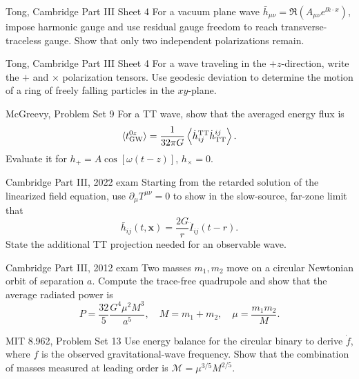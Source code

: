 \begin{exercises}

\begin{exercise}{Tong, Cambridge Part III Sheet 4}
For a vacuum plane wave
\(\bar h_{\mu\nu}=\Re(A_{\mu\nu}e^{\ii k\cdot x})\), impose harmonic gauge and
use residual gauge freedom to reach transverse-traceless gauge.  Show that
only two independent polarizations remain.
\end{exercise}

\begin{exercise}{Tong, Cambridge Part III Sheet 4}
For a wave traveling in the \(+z\)-direction, write the \(+\) and \(\times\)
polarization tensors.  Use geodesic deviation to determine the motion of a
ring of freely falling particles in the \(xy\)-plane.
\end{exercise}

\begin{exercise}{McGreevy, Problem Set 9}
For a TT wave, show that the averaged energy flux is
\[
\langle t^{0z}_{\rm GW}\rangle
=\frac1{32\pi G}
\left\langle\dot h^{\rm TT}_{ij}\dot h_{\rm TT}^{ij}\right\rangle.
\]
Evaluate it for \(h_+=A\cos[\omega(t-z)]\), \(h_\times=0\).
\end{exercise}

\begin{exercise}{Cambridge Part III, 2022 exam}
Starting from the retarded solution of the linearized field equation, use
\(\partial_\mu T^{\mu\nu}=0\) to show in the slow-source, far-zone limit that
\[
\bar h_{ij}(t,\bm x)=\frac{2G}{r}\ddot I_{ij}(t-r).
\]
State the additional TT projection needed for an observable wave.
\end{exercise}

\begin{exercise}{Cambridge Part III, 2012 exam}
Two masses \(m_1,m_2\) move on a circular Newtonian orbit of separation \(a\).
Compute the trace-free quadrupole and show that the average radiated power is
\[
P=\frac{32}{5}\frac{G^4\mu^2M^3}{a^5},
\quad M=m_1+m_2,\quad \mu=\frac{m_1m_2}{M}.
\]
\end{exercise}

\begin{exercise}{MIT 8.962, Problem Set 13}
Use energy balance for the circular binary to derive \(\dot f\), where \(f\)
is the observed gravitational-wave frequency.  Show that the combination of
masses measured at leading order is
\(\mathcal M=\mu^{3/5}M^{2/5}\).
\end{exercise}


\end{exercises}
